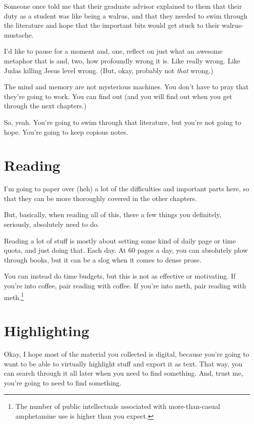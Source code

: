 Someone once told me that their graduate advisor explained to them that their
duty as a student was like being a walrus, and that they needed to swim
through the literature and hope that the important bits would get stuck to their
walrus-mustache.

I'd like to pause for a moment and, one, reflect on just what an awesome
metaphor that is and, two, how profoundly wrong it is. Like really wrong. Like Judas
killing Jesus level wrong. (But, okay, probably not \textit{that} wrong.)

The mind and memory
are not mysterious machines. You don't have to pray that they're going to
work. You can find out (and you will find out when you get through the next chapters.)

So, yeah. You're going to swim through that literature, but you're not going to
hope. You're going to keep copious notes.

\section{Reading}

I'm going to paper over (heh) a lot of the difficulties and important parts
here, so that they can be more thoroughly covered in the other chapters.

But, basically, when reading all of this, there a few things you definitely,
seriously, absolutely need to do.

Reading a lot of stuff is mostly about setting some kind of daily page or time
quota, and just doing that. Each day. At 60 pages a day, you can absolutely plow
through books, but it can be a slog when it comes to dense prose.

You can instead do time budgets, but this is not as effective or motivating. If
you're into coffee, pair reading with coffee. If you're into meth, pair reading with meth.\footnote{The number of public intellectuals associated with more-than-casual amphetamine use is higher than you expect.}

\section{Highlighting}

Okay, I hope most of the material you collected is digital, because you're
going to want to be able to virtually highlight stuff and export it as
text. That way, you can search through it all later when you need to find
something. And, trust me, you're going to need to find something.

